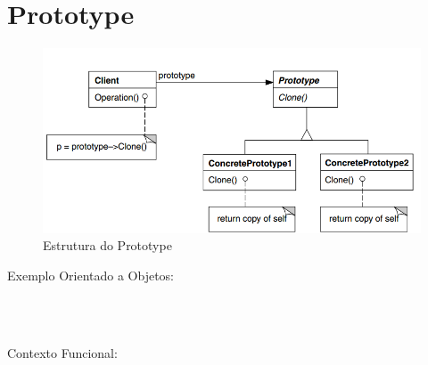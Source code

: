 \section{Prototype}

\begin{figure}[htb]
	\caption{\label{fig_grafico}Estrutura do Prototype}
	\begin{center}
	    \includegraphics[scale=0.5]{5_padroes-contexto-funcional/5.1_criacionais/5.1.4_prototype/diagram.png}
	\end{center}
\end{figure}

Exemplo Orientado a Objetos:

\begin{lstlisting}[caption={Prototype Orientado a Objetos},label=ooprototype]



\end{lstlisting}

Contexto Funcional:


\begin{lstlisting}[caption={Prototype Funcional},label=fpprototype]
    

    
\end{lstlisting}